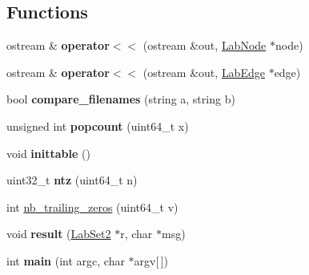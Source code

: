\subsection*{Functions}
\begin{DoxyCompactItemize}
\item 
\hypertarget{namespaceelps_ab1d18bc1f2ed3199fdb183cdd29a91d2}{ostream \& {\bfseries operator$<$$<$} (ostream \&out, \hyperlink{classelps_1_1_lab_node}{Lab\+Node} $\ast$node)}\label{namespaceelps_ab1d18bc1f2ed3199fdb183cdd29a91d2}

\item 
\hypertarget{namespaceelps_a6efd530738d52339fa124e837ba6c171}{ostream \& {\bfseries operator$<$$<$} (ostream \&out, \hyperlink{classelps_1_1_lab_edge}{Lab\+Edge} $\ast$edge)}\label{namespaceelps_a6efd530738d52339fa124e837ba6c171}

\item 
\hypertarget{namespaceelps_a3b9ce21c1692379a997fbe75e871f994}{bool {\bfseries compare\+\_\+filenames} (string a, string b)}\label{namespaceelps_a3b9ce21c1692379a997fbe75e871f994}

\item 
\hypertarget{namespaceelps_a232a05fdc05649178b2644ff3186203f}{unsigned int {\bfseries popcount} (uint64\+\_\+t x)}\label{namespaceelps_a232a05fdc05649178b2644ff3186203f}

\item 
\hypertarget{namespaceelps_a2df24b43eb499d9100bcfdb3bc6b74e2}{void {\bfseries inittable} ()}\label{namespaceelps_a2df24b43eb499d9100bcfdb3bc6b74e2}

\item 
\hypertarget{namespaceelps_a041eb1062ecbbb4c933f4bf132f84c12}{uint32\+\_\+t {\bfseries ntz} (uint64\+\_\+t n)}\label{namespaceelps_a041eb1062ecbbb4c933f4bf132f84c12}

\item 
int \hyperlink{namespaceelps_af01af9267f7811e8abae9cb750194e9f}{nb\+\_\+trailing\+\_\+zeros} (uint64\+\_\+t v)
\item 
\hypertarget{namespaceelps_a56c842a8ddf251405e7f9040c202cbaa}{void {\bfseries result} (\hyperlink{classelps_1_1_lab_set2}{Lab\+Set2} $\ast$r, char $\ast$msg)}\label{namespaceelps_a56c842a8ddf251405e7f9040c202cbaa}

\item 
\hypertarget{namespaceelps_ae2fd1a0e801f6cb09d76a6ce807a40cf}{int {\bfseries main} (int argc, char $\ast$argv\mbox{[}$\,$\mbox{]})}\label{namespaceelps_ae2fd1a0e801f6cb09d76a6ce807a40cf}

\end{DoxyCompactItemize}


